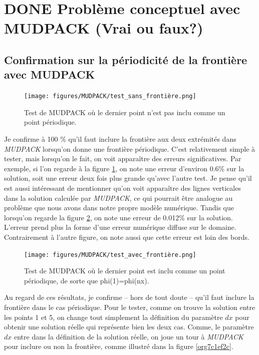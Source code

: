 \documentclass[10pt]{article}
\numberwithin{equation}{section}
\begin{document}
\section{{\bfseries\sffamily DONE} Problème conceptuel avec MUDPACK (Vrai ou faux?)}
\label{sec:orga11c754}

\subsection{Confirmation sur la périodicité de la frontière avec MUDPACK}
\label{sec:orgdd7df40}

\begin{figure}[!htpb]
\centering
\texttt{[image: figures/MUDPACK/test\_sans\_frontière.png]}
\caption{\label{fig:org581ea6a}Test de MUDPACK où le dernier point n'est pas inclu comme un point périodique.}
\end{figure}

Je confirme à 100 \% qu'il faut inclure la frontière aux deux extrémités dans \emph{MUDPACK} lorsqu'on donne une frontière périodique.
C'est relativement simple à tester, mais lorsqu'on le fait, on voit apparaître des erreurs significatives.
Par exemple, si l'on regarde à la figure \ref{fig:org581ea6a}, on note une erreur d'environ 0.6\% sur la solution, soit une erreur deux fois plus grande qu'avec l'autre test.
Je pense qu'il est aussi intéressant de mentionner qu'on voit apparaître des lignes verticales dans la solution calculée par \emph{MUDPACK}, ce qui pourrait être analogue au problème que nous avons dans notre propre modèle numérique. 
Tandis que lorsqu'on regarde la figure \ref{fig:org7ee983b}, on note une erreur de 0.012\% sur la solution.
L'erreur prend plus la forme d'une erreur numérique diffuse sur le domaine.
Contrairement à l'autre figure, on note aussi que cette erreur est loin des bords. \bigskip

\begin{figure}[!htpb]
\centering
\texttt{[image: figures/MUDPACK/test\_avec\_frontière.png]}
\caption{\label{fig:org7ee983b}Test de MUDPACK où le dernier point est inclu comme un point périodique, de sorte que phi(1)=phi(nx).}
\end{figure}

Au regard de ces résultats, je confirme -- hors de tout doute -- qu'il faut inclure la frontière dans le cas périodique.
Pour le tester, comme on trouve la solution entre les points 1 et 5, on change tout simplement la définition du paramètre \(dx\) pour obtenir une solution réelle qui représente bien les deux cas.
Comme, le paramètre \(dx\) entre dans la définition de la solution réelle, on joue un tour à \emph{MUDPACK} pour inclure ou non la frontière, comme illustré dans la figure \ref{org7c1ef2c}. \bigskip
\end{document}
